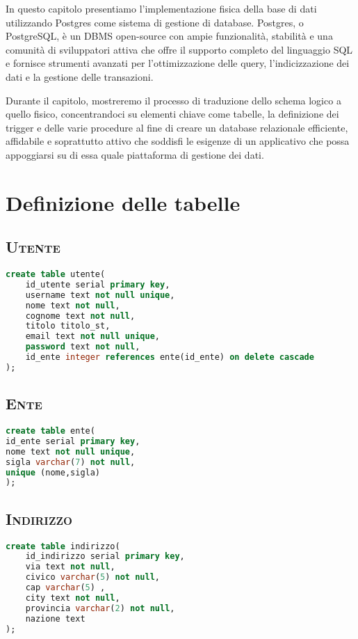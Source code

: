 In questo capitolo presentiamo l'implementazione fisica della base di dati utilizzando Postgres come sistema di gestione di database. Postgres, o PostgreSQL, è un DBMS open-source con ampie funzionalità, stabilità e una comunità di sviluppatori attiva che offre il supporto completo del linguaggio SQL e fornisce strumenti avanzati per l'ottimizzazione delle query, l'indicizzazione dei dati e la gestione delle transazioni. 
\bigskip

Durante il capitolo, mostreremo il processo di traduzione dello schema logico a quello fisico, concentrandoci su elementi chiave come tabelle, la definizione dei trigger e delle varie procedure al fine di creare un database relazionale efficiente, affidabile e soprattutto attivo che soddisfi le esigenze di un applicativo che possa appoggiarsi su di essa quale piattaforma di gestione dei dati.
\section{Definizione delle tabelle}
\subsection{\textsc{Utente}}

\begin{lstlisting}[language=SQL,style=mystyle,caption={Tabella: Utente}]
create table utente(
    id_utente serial primary key,
    username text not null unique,
    nome text not null,
    cognome text not null,
    titolo titolo_st,
    email text not null unique,
    password text not null,
    id_ente integer references ente(id_ente) on delete cascade
);
\end{lstlisting}
\subsection{\textsc{Ente}}
\begin{lstlisting}[language=SQL,style=mystyle,caption={Tabella: Ente}]
create table ente(
id_ente serial primary key,
nome text not null unique,
sigla varchar(7) not null,
unique (nome,sigla)
);
\end{lstlisting}
\subsection{\textsc{Indirizzo}}
\begin{lstlisting}[language=SQL,style=mystyle,caption={Tabella: Indirizzo}]
create table indirizzo(
    id_indirizzo serial primary key,
    via text not null,
    civico varchar(5) not null,
    cap varchar(5) ,
    city text not null,
    provincia varchar(2) not null,
    nazione text
);
\end{lstlisting}
